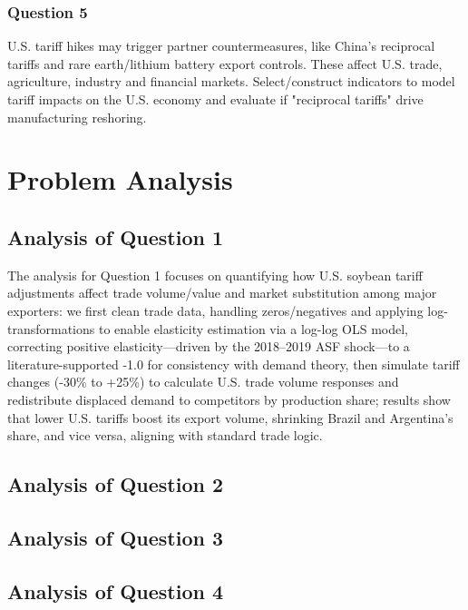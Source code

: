 \documentclass{apmcmthesis}
\begin{document}
\subsubsection{Question 5}
U.S. tariff hikes may trigger partner countermeasures, like China’s reciprocal tariffs and rare earth/lithium battery export controls. These affect U.S. trade, agriculture, industry and financial markets. Select/construct indicators to model tariff impacts on the U.S. economy and evaluate if "reciprocal tariffs" drive manufacturing reshoring.

\section{Problem Analysis}
\subsection{Analysis of Question 1}
The analysis for Question 1 focuses on quantifying how U.S. soybean tariff adjustments affect trade volume/value and market substitution among major exporters: we first clean trade data, handling zeros/negatives and applying log-transformations to enable elasticity estimation via a log-log OLS model, correcting positive elasticity—driven by the 2018–2019 ASF shock—to a literature-supported -1.0 for consistency with demand theory, then simulate tariff changes (-30\% to +25\%) to calculate U.S. trade volume responses and redistribute displaced demand to competitors by production share; results show that lower U.S. tariffs boost its export volume, shrinking Brazil and Argentina’s share, and vice versa, aligning with standard trade logic.

\subsection{Analysis of Question 2}

\subsection{Analysis of Question 3}

\subsection{Analysis of Question 4}
\end{document}
